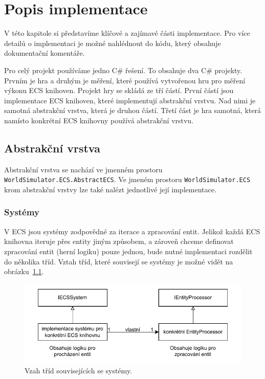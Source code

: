 \chapter{Popis implementace}
V této kapitole si představíme klíčové a zajímavé části implementace. Pro více detailů o implementaci je možné nahlédnout do kódu, který obsahuje dokumentační komentáře.

Pro celý projekt používáme jedno C\# řešení. To obsahuje dva C\# projekty. Prvním je hra a druhým je měření, které používá vytvořenou hru pro měření výkonu ECS knihoven. Projekt hry se skládá ze tří částí. První částí jsou implementace ECS knihoven, které implementují abstrakční vrstvu. Nad nimi je samotná abstrakční vrstva, která je druhou částí. Třetí část je hra samotná, která namísto konkrétní ECS knihovny používá abstrakční vrstvu.

\section{Abstrakční vrstva}
\label{sec:abstract-layer}
Abstrakční vrstva se nachází ve jmenném prostoru \texttt{WorldSimulator.ECS.AbstractECS}. Ve jmeném prostoru \texttt{WorldSimulator.ECS} krom abstrakční vrstvy lze také nalézt jednotlivé její implementace.

\subsection{Systémy}
V ECS jsou systémy zodpovědné za iterace a zpracování entit. Jelikož každá ECS knihovna iteruje přes entity jiným způsobem, a zároveň chceme definovat zpracování entit (herní logiku) pouze jednou, bude nutné implementaci rozdělit do několika tříd. Vztah tříd, které souvisejí se systémy je možné vidět na obrázku~\ref{fig:abstract-layer-systems}.

\begin{figure}[!htb]
  \centering
  \includegraphics[width=0.8\linewidth]{img/abstract-layer-systems.pdf}
  \caption{Vzah tříd souvisejících se systémy.}
  \label{fig:abstract-layer-systems}
\end{figure}

